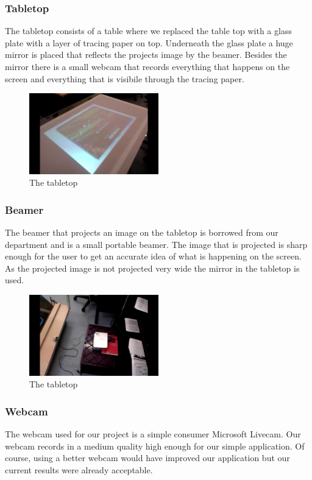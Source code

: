 \documentclass[a4paper,10pt]{report}
\begin{document}
		\subsubsection{Tabletop}
		The tabletop consists of a table where we replaced the table top with a glass plate with a layer of tracing paper on top.
		Underneath the glass plate a huge mirror is placed that reflects the projects image by the beamer. 
		Besides the mirror there is a small webcam that records everything that happens on the screen and everything that is visibile through the tracing paper. 

		\begin{figure}[h!]
		\caption{The tabletop}
		\centering
		\includegraphics[width=0.5\textwidth]{images/tabletop}
		\end{figure}

		\subsubsection{Beamer}
		The beamer that projects an image on the tabletop is borrowed from our department and is a small portable beamer.
		The image that is projected is sharp enough for the user to get an accurate idea of what is happening on the screen. 
		As the projected image is not projected very wide the mirror in the tabletop is used. 

		\begin{figure}[h!]
		\caption{The tabletop}
		\centering
		\includegraphics[width=0.5\textwidth]{images/beamer}
		\end{figure}

		\subsubsection{Webcam}
		The webcam used for our project is a simple consumer Microsoft Livecam. 
		Our webcam records in a medium quality high enough for our simple application. 
		Of course, using a better webcam would have improved our application but our current results were already acceptable. 
\end{document}
